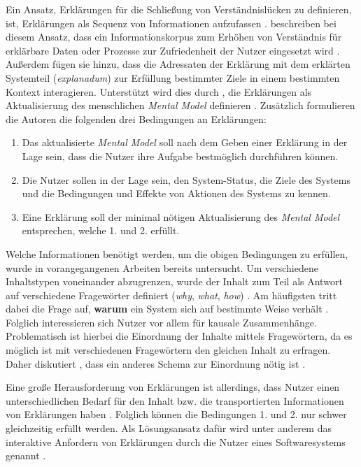 Ein Ansatz, Erklärungen für die Schließung von Verständnislücken zu definieren, ist, Erklärungen als Sequenz von Informationen aufzufassen \cite[vgl.][]{wang_integration_2020}. \citeauthor{sovrano_modelling_2020} beschreiben bei diesem Ansatz, dass ein Informationskorpus zum Erhöhen von Verständnis für erklärbare Daten oder Prozesse zur Zufriedenheit der Nutzer eingesetzt wird \cite[übersetzt vgl.][]{sovrano_modelling_2020}. Außerdem fügen sie hinzu, dass die Adressaten der Erklärung mit dem erklärten Systemteil (\textit{explanadum}) zur Erfüllung bestimmter Ziele in einem bestimmten Kontext interagieren. Unterstützt wird dies durch \citeauthor{zahedi_towards_2019}, die Erklärungen als \glqq Aktualisierung des menschlichen \textit{Mental Model}\grqq{} definieren \cite[übersetzt vgl.][]{zahedi_towards_2019}. Zusätzlich formulieren die Autoren die folgenden drei Bedingungen an Erklärungen:
\begin{enumerate}
    \item Das aktualisierte \textit{Mental Model} soll nach dem Geben einer Erklärung in der Lage sein, dass die Nutzer ihre Aufgabe bestmöglich durchführen können.
    \item Die Nutzer sollen in der Lage sein, den System-Status, die Ziele des Systems und die Bedingungen und Effekte von Aktionen des Systems zu kennen.
    \item Eine Erklärung soll der minimal nötigen Aktualisierung des \textit{Mental Model} entsprechen, welche 1. und 2. erfüllt.
\end{enumerate}

Welche Informationen benötigt werden, um die obigen Bedingungen zu erfüllen, wurde in vorangegangenen Arbeiten bereits untersucht. Um verschiedene Inhaltstypen voneinander abzugrenzen, wurde der Inhalt zum Teil als Antwort auf verschiedene Fragewörter definiert (\textit{why}, \textit{what}, \textit{how}) \cite{rosenfeld_explainability_2019}. Am häufigsten tritt dabei die Frage auf, \textbf{warum} ein System sich auf bestimmte Weise verhält \cite{chazette2020explainability}. Folglich interessieren sich Nutzer vor allem für kausale Zusammenhänge. Problematisch ist hierbei die Einordnung der Inhalte mittels Fragewörtern, da es möglich ist mit verschiedenen Fragewörtern den gleichen Inhalt zu erfragen. Daher diskutiert \citeauthor{wang_integration_2020}, dass ein anderes Schema zur Einordnung nötig ist \cite{wang_integration_2020}.

Eine große Herausforderung von Erklärungen ist allerdings, dass Nutzer einen unterschiedlichen Bedarf für den Inhalt bzw. die transportierten Informationen von Erklärungen haben \cite{chazette2020explainability}. Folglich können die Bedingungen 1. und 2. nur schwer gleichzeitig erfüllt werden. Als Lösungsansatz dafür wird unter anderem das interaktive Anfordern von Erklärungen durch die Nutzer eines Softwaresystems genannt \cite{chazette_end-users_nodate}.

